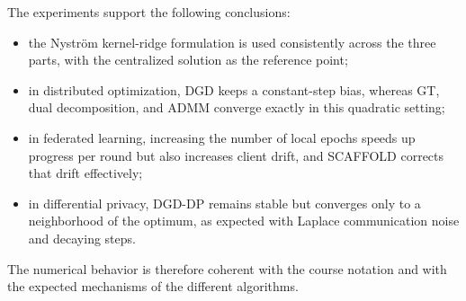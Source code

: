 \documentclass[11pt,a4paper]{article}
\begin{document}
The experiments support the following conclusions:
\begin{itemize}
\item the Nyström kernel-ridge formulation is used consistently across the three parts, with the centralized solution as the reference point;
\item in distributed optimization, DGD keeps a constant-step bias, whereas GT, dual decomposition, and ADMM converge exactly in this quadratic setting;
\item in federated learning, increasing the number of local epochs speeds up progress per round but also increases client drift, and SCAFFOLD corrects that drift effectively;
\item in differential privacy, DGD-DP remains stable but converges only to a neighborhood of the optimum, as expected with Laplace communication noise and decaying steps.
\end{itemize}

The numerical behavior is therefore coherent with the course notation and with the expected mechanisms of the different algorithms.
\end{document}
